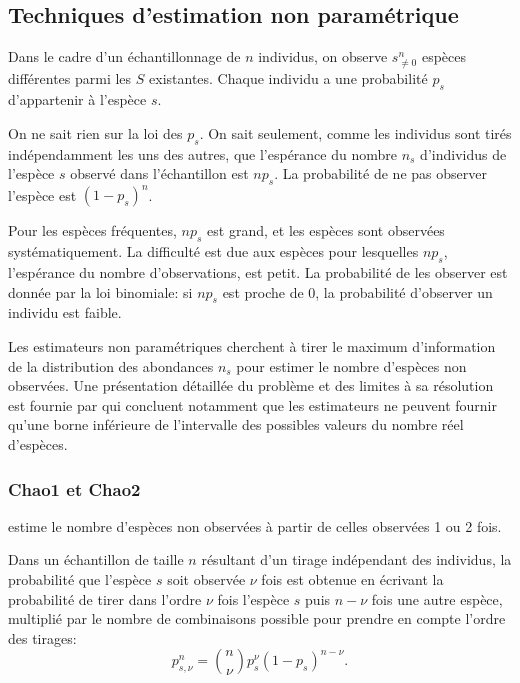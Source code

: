 \documentclass[
  11pt,
  french,
  a4paper,
  extrafontsizes,onecolumn,openright
  ]{memoir}
\begin{document}
\hypertarget{techniques-destimation-non-paramuxe9trique}{%
\subsection{Techniques d'estimation non paramétrique}\label{techniques-destimation-non-paramuxe9trique}}

Dans le cadre d'un échantillonnage de \(n\) individus, on observe \(s^{n}_{\ne 0}\) espèces différentes parmi les \(S\) existantes.
Chaque individu a une probabilité \(p_s\) d'appartenir à l'espèce \(s\).

On ne sait rien sur la loi des \(p_s\).
On sait seulement, comme les individus sont tirés indépendamment les uns des autres, que l'espérance du nombre \(n_s\) d'individus de l'espèce \(s\) observé dans l'échantillon est \(np_s\).
La probabilité de ne pas observer l'espèce est \((1-p_s)^n\).

Pour les espèces fréquentes, \(np_s\) est grand, et les espèces sont observées systématiquement.
La difficulté est due aux espèces pour lesquelles \(np_s\), l'espérance du nombre d'observations, est petit.
La probabilité de les observer est donnée par la loi binomiale: si \(np_s\) est proche de 0, la probabilité d'observer un individu est faible.

Les estimateurs non paramétriques cherchent à tirer le maximum d'information de la distribution des abondances \(n_s\) pour estimer le nombre d'espèces non observées.
Une présentation détaillée du problème et des limites à sa résolution est fournie par \textcite{Mao2005} qui concluent notamment que les estimateurs ne peuvent fournir qu'une borne inférieure de l'intervalle des possibles valeurs du nombre réel d'espèces.

\hypertarget{chao1-et-chao2}{%
\subsubsection{Chao1 et Chao2}\label{chao1-et-chao2}}

\textcite{Chao1984} estime le nombre d'espèces non observées à partir de celles observées 1 ou 2 fois.

Dans un échantillon de taille \(n\) résultant d'un tirage indépendant des individus, la probabilité que l'espèce \(s\) soit observée \(\nu\) fois est obtenue en écrivant la probabilité de tirer dans l'ordre \(\nu\) fois l'espèce \(s\) puis \(n-\nu\) fois une autre espèce, multiplié par le nombre de combinaisons possible pour prendre en compte l'ordre des tirages:
\begin{equation}
  \label{eq:psnu}
  p^{n}_{s, \nu} = \binom{n}{\nu} {p_s^\nu \left( 1-p_s \right)^{n-\nu}}.
\end{equation}
\end{document}
